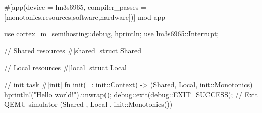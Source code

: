 #[app(device = lm3s6965, compiler_passes = [monotonics,resources,software,hardware])]
mod app {
    use cortex_m_semihosting::{debug, hprintln};
    use lm3s6965::Interrupt;

    // Shared resources
    #[shared]
    struct Shared {}

    // Local resources
    #[local]
    struct Local {}

    // init task
    #[init]
    fn init(_: init::Context) -> (Shared, Local, init::Monotonics) {
        hprintln!("Hello world!").unwrap();
        debug::exit(debug::EXIT_SUCCESS); // Exit QEMU simulator
        (Shared {}, Local {}, init::Monotonics())
    }
}
